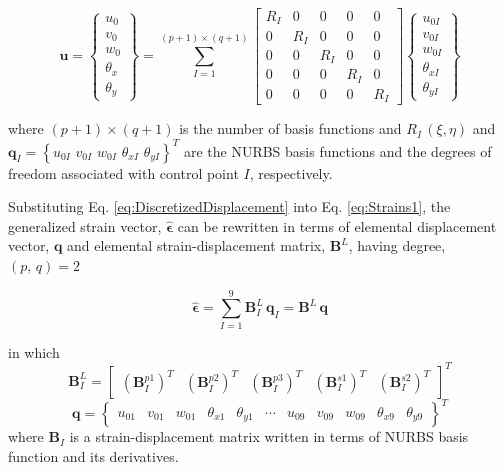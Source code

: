 \documentclass[3p,preprint,12pt]{elsarticle}
\begin{document}
\begin{equation} \label{eq:DiscretizedDisplacement}
\boldsymbol{u}  = \left\{ \begin{array}{c}
u_{0}\\
v_{0}\\
w_{0}\\
\theta_{x}\\
\theta_{y}
\end{array}\right\} =\sum_{I=1}^{\left(p+1\right)\times\left(q+1\right)}\left[\begin{array}{ccccc}
R_{I} & 0 & 0 & 0 & 0\\
0 & R_{I} & 0 & 0 & 0\\
0 & 0 & R_{I} & 0 & 0\\
0 & 0 & 0 & R_{I} & 0\\
0 & 0 & 0 & 0 & R_{I}
\end{array}\right]\left\{ \begin{array}{c}
u_{0I}\\
v_{0I}\\
w_{0I}\\
\theta_{xI}\\
\theta_{yI}
\end{array}\right\}
\end{equation}

where $\left(p+1\right)\times\left(q+1\right)$ is the number of basis functions and ${R}_{I}\,(\xi,\eta)$ and $\textbf{q}_{I}=\left\{ u_{0I}\,\,v_{0I}\,\,w_{0I}\,\,\theta_{xI}\,\,\theta_{yI} \right\}^{T}$ are the NURBS basis functions and the degrees of freedom associated with control point $I$, respectively.

Substituting Eq. \cref{eq:DiscretizedDisplacement} into Eq. \cref{eq:Strains1}, the generalized strain vector, $ \boldsymbol{\hat{\epsilon}}  $ can be rewritten in terms of elemental displacement vector, $\boldsymbol{q}$ and elemental strain-displacement matrix, $\boldsymbol{B}^{L}$, having degree, $(p,\,q) = 2$

\begin{equation}\label{eq:GeneralizedLinearStrain}
\boldsymbol{\hat{\epsilon}} = \sum_{I=1}^{9} 
\boldsymbol{B}^{L}_{I} \, \boldsymbol{q}_{I}=\boldsymbol{B}^{L} \, \boldsymbol{q}
\end{equation}

in which 
\begin{equation*}
\boldsymbol{B}_{I}^{L}=\left[\begin{array}{ccccc}
\left(\boldsymbol{B}_{I}^{p1}\right)^{T} & \left(\boldsymbol{B}_{I}^{p2}\right)^{T} & \left(\boldsymbol{B}_{I}^{p3}\right)^{T} & \left(\boldsymbol{B}_{I}^{s1}\right)^{T} & \left(\boldsymbol{B}_{I}^{s2}\right)^{T}\end{array}\right]^{T}
\end{equation*}
\begin{equation*}
\boldsymbol{q} = \left\{ 
\begin{array}{ccccccccccc}
u_{01}& v_{01}& w_{01}& \theta_{x1}& \theta_{y1}&  \cdots& u_{09}& v_{09}& w_{09}& \theta_{x9}& \theta_{y9}
\end{array}
\right\}^{T}
\end{equation*}
where $\boldsymbol{B}_I$ is a strain-displacement matrix written in terms of NURBS basis function and its derivatives.
\end{document}
